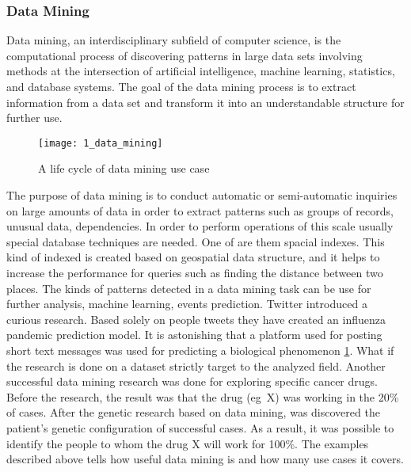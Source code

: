 \clearpage

\subsubsection{Data Mining}
Data mining, an interdisciplinary subfield of computer science, is the computational process of discovering patterns in large data sets involving methods at the intersection of artificial intelligence, machine learning, statistics, and database systems. The goal of the data mining process is to extract information from a data set and transform it into an understandable structure for further use.

\begin{figure}[!ht]
\centering
\texttt{[image: 1\_data\_mining]}
\caption{A life cycle of data mining use case}\label{data_mining}
\end{figure}

The purpose of data mining is to conduct automatic or semi-automatic inquiries on large amounts of data in order to extract patterns such as groups of records, unusual data, dependencies. In order to perform operations of this scale usually special database techniques are needed. One of are them spacial indexes. This kind of indexed is created based on geospatial data structure, and it helps to increase the performance for queries such as finding the distance between two places. The kinds of patterns detected in a data mining task can be use for further analysis, machine learning, events prediction. Twitter introduced a curious research. Based solely on people tweets they have created an influenza pandemic prediction model. It is astonishing that a platform used for posting short text messages was used for predicting a biological phenomenon \mbox{\ref{data_mining}}. What if the research is done on a dataset strictly target to the analyzed field. Another successful data mining research was done for exploring specific cancer drugs. Before the research, the result was that the drug \mbox{(eg X)} was working in the 20\% of cases. After the genetic research based on data mining, was discovered the patient's genetic configuration of successful cases. As a result, it was possible to identify the people to whom the drug X will work for 100\%. The examples described above tells how useful data mining is and how many use cases it covers.

